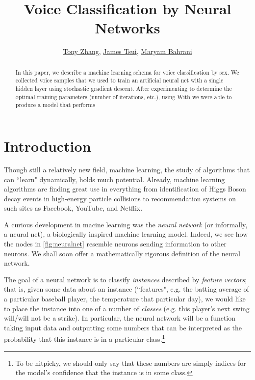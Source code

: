 \documentclass[10pt]{article}
\title{Voice Classification by Neural Networks}
\author{
	\href{mailto:txz@mit.edu}{Tony Zhang},
	\href{mailto:jtsui@hotchkiss.org}{James Tsui},
	\href{mailto:mbahrani@hotchkiss.org}{Maryam Bahrani}
}
\begin{document}
\maketitle

\begin{abstract}
% 

In this paper, we describe a machine learning schema for voice classification by sex. We collected %
voice samples that we used to train an artificial neural net with a single hidden layer using stochastic gradient descent. After experimenting to determine the optimal training parameters (number of iterations, etc.), using %
With %
we were able to produce a model that performs %
\end{abstract}

\section{Introduction}


Though still a relatively new field, machine learning, the study of algorithms that can ``learn" dynamically, holds much potential.
Already, machine learning algorithms are finding great use in everything from identification of Higgs Boson decay events in high-energy particle collisions to recommendation systems on such sites as Facebook, YouTube, and Netflix.

A curious development in macine learning was the \emph{neural network} (or informally, a neural net), a biologically inspired machine learning model.
Indeed, we see how the nodes in \cref{fig:neuralnet} resemble neurons sending information to other neurons.
We shall soon offer a mathematically rigorous definition of the neural network.

The goal of a neural network is to classify \emph{instances} described by \emph{feature vectors}; that is, given some data about an instance (``features", e.g. the batting average of a particular baseball player, the temperature that particular day), we would like to place the instance into one of a number of \emph{classes} (e.g. this player's next swing will/will not be a strike).
In particular, the neural network will be a function taking input data and outputting some numbers that can be interpreted as the probability that this instance is in a particular class.\footnote{To be nitpicky, we should only say that these numbers are simply indices for the model's confidence that the instance is in some class.}
\end{document}
